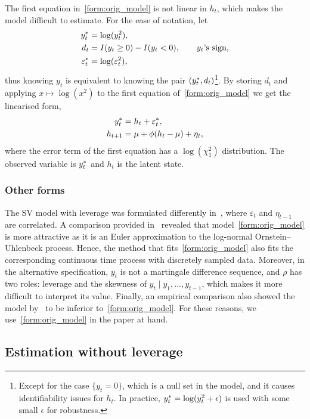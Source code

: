 The first equation in~\eqref{form:orig_model} is not linear in $h_t$, which makes the model difficult to estimate. For the ease of notation, let
\begin{align*}
y_t^\ast &=\log(y^2_t), \\
d_t &=I(y_t\ge0)-I(y_t<0), \qquad\text{$y_t$'s sign,} \\
\varepsilon_t^\ast &=\log(\varepsilon^2_t),
\end{align*}
thus knowing $y_t$ is equivalent to knowing the pair $(y_t^\ast, d_t)$\footnote{Except for the case $\{y_t=0\}$, which is a null set in the model, and it causes identifiability issues for $h_t$. In practice, $y_t^\ast =\log(y^2_t+\epsilon)$ is used with some small $\epsilon$ for robustness.}. By storing $d_t$ and applying $x\mapsto\log(x^2)$ to the first equation of~\eqref{form:orig_model} we get the linearised form,
\begin{align}
\begin{split}\label{form:lin_model}
y_t^\ast & = h_t+\varepsilon_t^\ast, \\
h_{t+1} & = \mu+\phi(h_t-\mu)+\eta_t,
\end{split}
\end{align}
where the error term of the first equation has a $\log(\chi_1^2)$ distribution. The observed variable is $y_t^\ast$ and $h_t$ is the latent state.

\subsubsection*{Other forms}

The SV model with leverage was formulated differently in~\citet{Jacquier2004}, where $\varepsilon_t$ and $\eta_{t-1}$ are correlated.
A comparison provided in~\citet{yu2005leverage} revealed that model~\eqref{form:orig_model} is more attractive as it is an Euler approximation to the log-normal Ornstein--Uhlenbeck process.
Hence, the method that fits~\eqref{form:orig_model} also fits the corresponding continuous time process with discretely sampled data.
Moreover, in the alternative specification, $y_t$ is not a martingale difference sequence, and $\rho$ has two roles: leverage and the skewness of $y_t\mid y_1,\dots,y_{t-1}$, which makes it more difficult to interpret its value.
Finally, an empirical comparison also showed the model by~\citet{Jacquier2004} to be inferior to~\eqref{form:orig_model}.
For these reasons, we use~\eqref{form:orig_model} in the paper at hand.

\subsection{Estimation without leverage}

